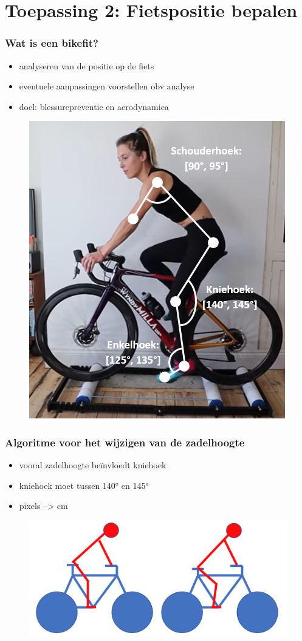 \documentclass
   [kulak] %
   {kulakbeamer}
\begin{document}
\section{Toepassing 2: Fietspositie bepalen}

\begin{frame}
	\frametitle{Wat is een bikefit?}
	\begin{itemize}
		\item analyseren van de positie op de fiets
		\item eventuele aanpassingen voorstellen obv analyse
		\item doel: blessurepreventie en aerodynamica
	\end{itemize}
\begin{figure}
	\includegraphics[width= .4\textwidth]{bikefit_hoeken_foto}
\end{figure}
\end{frame}

\begin{frame}
	\frametitle{Algoritme voor het wijzigen van de zadelhoogte}
	\begin{itemize}
		\item vooral zadelhoogte beïnvloedt kniehoek
		\item kniehoek moet tussen 140° en 145°
		\item pixels --> \si{cm}
	\end{itemize}
	\begin{figure}
		\includegraphics[width= \textwidth]{zadel.png}
	\end{figure}
\end{frame}
\end{document}
